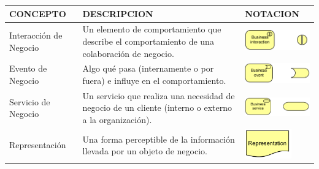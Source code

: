 \begin{table}[H]
	\centering
	\begin{tabular}{| m{4cm} | m{4cm} | m{4cm} | }
		\hline
		\centering\vspace{1.52mm}CONCEPTO & \centering\vspace{1.52mm}DESCRIPCION &\vspace{1.52mm}NOTACION \\
		\hline
		\centering\vspace{1.52mm}Interacción de Negocio & \vspace{1.52mm}Un elemento de comportamiento que describe el comportamiento de una colaboración de negocio.   & \vspace{1.52mm}\includegraphics[width=40mm]{arquitectura/imagenes/19} \\
		\hline
		\centering\vspace{1.52mm}Evento de Negocio & \vspace{1.52mm}Algo qué pasa (internamente o por fuera) e influye en el comportamiento. & \vspace{1.52mm}\includegraphics[width=40mm]{arquitectura/imagenes/110} \\
		\hline
		\centering\vspace{1.52mm}Servicio de Negocio & \vspace{1.52mm}Un servicio que realiza una necesidad de negocio de un cliente (interno o externo a la organización). & \vspace{1.52mm}\includegraphics[width=40mm]{arquitectura/imagenes/111} \\
		\hline
		\centering\vspace{1.52mm}Representación & \vspace{1.52mm}Una forma perceptible de la información llevada por un objeto de negocio. & \vspace{1.52mm}\includegraphics[width=20mm]{arquitectura/imagenes/112} \\

\end{tabular}
\end{table}
